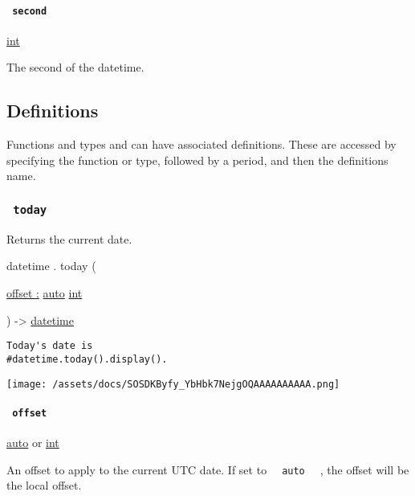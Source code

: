 \paragraph{\texorpdfstring{\texttt{\ second\ }}{ second }}\label{constructor-second}

\href{/docs/reference/foundations/int/}{int}

The second of the datetime.

\subsection{\texorpdfstring{{ Definitions
}}{ Definitions }}\label{definitions}

\label{definitions-tooltip}
Functions and types and can have associated definitions. These are
accessed by specifying the function or type, followed by a period, and
then the definition\textquotesingle s name.

\subsubsection{\texorpdfstring{\texttt{\ today\ }}{ today }}\label{definitions-today}

Returns the current date.

datetime { . } { today } (

{ \hyperref[definitions-today-parameters-offset]{offset :}
\href{/docs/reference/foundations/auto/}{auto}
\href{/docs/reference/foundations/int/}{int} }

) -\textgreater{} \href{/docs/reference/foundations/datetime/}{datetime}

\begin{verbatim}
Today's date is
#datetime.today().display().
\end{verbatim}

\texttt{[image: /assets/docs/SOSDKByfy\_YbHbk7NejgOQAAAAAAAAAA.png]}

\paragraph{\texorpdfstring{\texttt{\ offset\ }}{ offset }}\label{definitions-today-offset}

\href{/docs/reference/foundations/auto/}{auto} {or}
\href{/docs/reference/foundations/int/}{int}

An offset to apply to the current UTC date. If set to
\texttt{\ }{\texttt{\ auto\ }}\texttt{\ } , the offset will be the local
offset.

